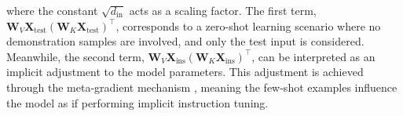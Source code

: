 where the constant $\sqrt{d_{\text{in}}}$ acts as a scaling factor. 
The first term, $\mathbf{W}_V\mathbf{X}_{\text{test}}(\mathbf{W}_K\mathbf{X}_{\text{test}})^\top$, corresponds to a zero-shot learning scenario where no demonstration samples are involved, and only the test input is considered. 
Meanwhile, the second term, $\mathbf{W}_V\mathbf{X}_{\text{ins}}(\mathbf{W}_K\mathbf{X}_{\text{ins}})^\top$, can be interpreted as an implicit adjustment to the model parameters. 
This adjustment is achieved through the meta-gradient mechanism \citep{dai2022iit1, yang2023iit2, irie2022iit3}, meaning the few-shot examples influence the model as if performing implicit instruction tuning.
